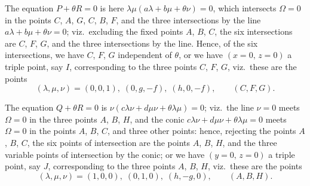 \documentclass[11pt]{article}
\begin{document}
The equation $P + \theta R = 0$ is here $\lambda\mu(a\lambda + b\mu + \theta\nu) = 0$, which intersects $\Omega = 0$ in the points $C$, $A$, $G$, $C$, $B$, $F$, and the three intersections by the line $a\lambda + b\mu + \theta\nu = 0$; viz.\ excluding the fixed points $A$, $B$, $C$, the six intersections are $C$, $F$, $G$, and the three intersections by the line. Hence, of the six intersections, we have $C$, $F$, $G$ independent of $\theta$, or we have $(x = 0,\, z = 0)$ a triple point, say $I$, corresponding to the three points $C$, $F$, $G$, viz.\ these are the points
\[
(\lambda,\mu,\nu) = (0,0,1),\; (0, g, -f),\; (h, 0, -f),\qquad (C, F, G).
\]

The equation $Q + \theta R = 0$ is $\nu(c\lambda\nu + d\mu\nu + \theta\lambda\mu) = 0$; viz.\ the line $\nu = 0$ meets $\Omega = 0$ in the three points $A$, $B$, $H$, and the conic $c\lambda\nu + d\mu\nu + \theta\lambda\mu = 0$ meets $\Omega = 0$ in the points $A$, $B$, $C$, and three other points: hence, rejecting the points $A$, $B$, $C$, the six points of intersection are the points $A$, $B$, $H$, and the three variable points of intersection by the conic; or we have $(y = 0,\, z = 0)$ a triple point, say $J$, corresponding to the three points $A$, $B$, $H$, viz.\ these are the points
\[
(\lambda,\mu,\nu) = (1,0,0),\;(0,1,0),\;(h, -g, 0),\qquad (A, B, H).
\]
\end{document}
